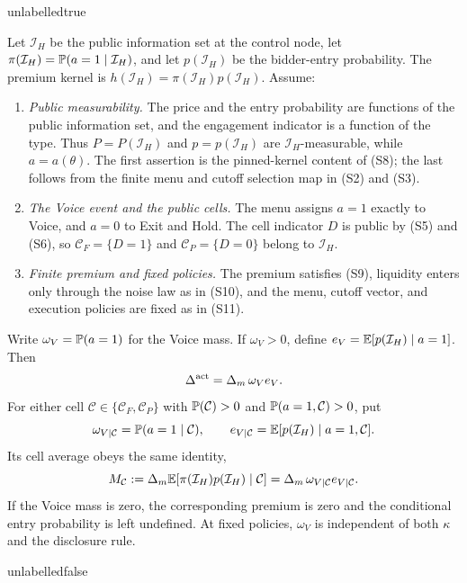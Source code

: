\csname unlabelledtrue\endcsname
\begin{lemma}
\label{lem:entry-identity}
Let $\mathcal I_H$ be the public information set at the control node, let
$\pi(\mathcal I_H)=\mathbb{P}(a=1\mid\mathcal I_H)$, and let
$p(\mathcal I_H)$ be the bidder-entry probability. The premium kernel is
$h(\mathcal I_H)=\pi(\mathcal I_H)p(\mathcal I_H)$. Assume:
\begin{enumerate}[label=(E-\arabic*),leftmargin=3.2em,itemsep=3pt]
\item \emph{Public measurability.} The price and the entry probability are functions of the public
  information set, and the engagement indicator is a function of the type. Thus
  $P=P(\mathcal I_H)$ and $p=p(\mathcal I_H)$ are $\mathcal I_H$-measurable, while
  $a=a(\theta)$. The first assertion is the pinned-kernel content of (S8); the last follows from
  the finite menu and cutoff selection map in (S2) and (S3).
\item \emph{The Voice event and the public cells.} The menu assigns $a=1$ exactly to Voice, and
  $a=0$ to Exit and Hold. The cell indicator $D$ is public by (S5) and (S6), so
  $\mathcal C_F=\{D=1\}$ and $\mathcal C_P=\{D=0\}$ belong to $\mathcal I_H$.
\item \emph{Finite premium and fixed policies.} The premium satisfies (S9), liquidity enters only
  through the noise law as in (S10), and the menu, cutoff vector, and execution policies are fixed
  as in (S11).
\end{enumerate}
Write $\omega_V=\mathbb{P}(a=1)$ for the Voice mass. If $\omega_V>0$, define
$e_V=\mathbb{E}[p(\mathcal I_H)\mid a=1]$. Then
\begin{equation}
\label{eq:entry-identity}
  \Delta^{\mathrm{act}}=\Delta_m\,\omega_V e_V .
\end{equation}
For either cell $\mathcal C\in\{\mathcal C_F,\mathcal C_P\}$ with
$\mathbb{P}(\mathcal C)>0$ and $\mathbb{P}(a=1,\mathcal C)>0$, put
\[
  \omega_{V\mid\mathcal C}=\mathbb{P}(a=1\mid\mathcal C),
  \qquad
  e_{V\mid\mathcal C}=\mathbb{E}[p(\mathcal I_H)\mid a=1,\mathcal C].
\]
Its cell average obeys the same identity,
\begin{equation}
\label{eq:entry-identity-cell}
  M_{\mathcal C}
  :=\Delta_m\mathbb{E}[\pi(\mathcal I_H)p(\mathcal I_H)\mid\mathcal C]
  =\Delta_m\,\omega_{V\mid\mathcal C}e_{V\mid\mathcal C}.
\end{equation}
If the Voice mass is zero, the corresponding premium is zero and the conditional entry
probability is left undefined. At fixed policies, $\omega_V$ is independent of both $\kappa$ and
the disclosure rule.
\end{lemma}
\csname unlabelledfalse\endcsname

